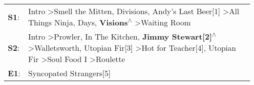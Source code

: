 \begin{supertabular}{p{0.03\textwidth}p{0.92\textwidth}}
 \textbf{S1}:  &                                                                                                             Intro\textsuperscript{} \textgreater \enspace Smell the Mitten\textsuperscript{}, \enspace Divisions\textsuperscript{}, \enspace Andy's Last Beer[1]\textsuperscript{} \textgreater \enspace All Things Ninja\textsuperscript{},  Days\textsuperscript{}, \enspace \textbf{Visions\textsuperscript{$\wedge$}} \textgreater \enspace Waiting Room\textsuperscript{}  \enspace  \\
 \textbf{S2}:  &  Intro\textsuperscript{} \textgreater \enspace Prowler\textsuperscript{}, \enspace In The Kitchen\textsuperscript{}, \enspace \textbf{Jimmy Stewart[2]\textsuperscript{$\wedge$}} \textgreater \enspace Walletsworth\textsuperscript{}, \enspace Utopian Fir[3]\textsuperscript{} \textgreater \enspace Hot for Teacher[4]\textsuperscript{}, \enspace Utopian Fir\textsuperscript{} \textgreater \enspace Soul Food I\textsuperscript{} \textgreater \enspace Roulette\textsuperscript{}  \enspace  \\
 \textbf{E1}:  &                                                                                                                                                                                                                                                                                                                                                                                                                                                 Syncopated Strangers[5]\textsuperscript{}  \enspace  \\
\end{supertabular}
